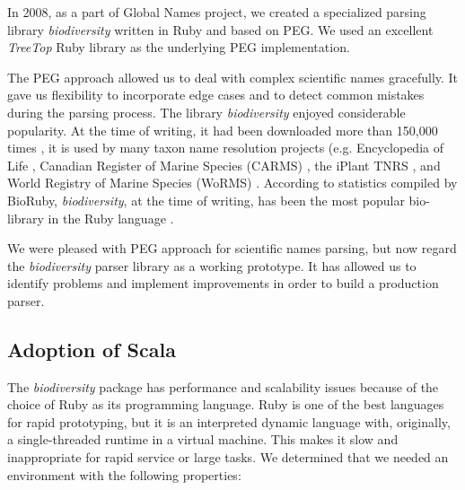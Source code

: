 \documentclass{bmcart}
\begin{document}
In 2008, as a part of Global Names project, we created a specialized parsing
library \textit{biodiversity} \cite{biodiversity} written in Ruby and based on
PEG\@. We used an excellent \textit{TreeTop} Ruby library \cite{treetop} as
the underlying PEG implementation.

The PEG approach allowed us to deal with complex scientific names gracefully.
It gave us flexibility to incorporate edge cases and to detect common mistakes
during the parsing process. The library \textit{biodiversity} enjoyed
considerable popularity. At the time of writing, it had been downloaded more
than 150,000 times \cite{bdiv-downloads}, it is used by many taxon name
resolution projects (e.g. Encyclopedia of Life \cite{eol}, Canadian Register of
Marine Species (CARMS) \cite{carms}, the iPlant TNRS \cite{iplant}, and World
Registry of Marine Species (WoRMS) \cite{worms}. According to statistics
compiled by BioRuby, \textit{biodiversity}, at the time of writing, has been
the most popular bio-library in the Ruby language \cite{biogems}.

We were pleased with PEG approach for scientific names parsing, but now regard
the \textit{biodiversity} parser library as a working prototype. It has allowed
us to identify problems and implement improvements in order to build a
production parser.

\subsection*{Adoption of Scala}

The \textit{biodiversity} package has performance and scalability issues
because of the choice of Ruby as its programming language. Ruby is one of the
best languages for rapid prototyping, but it is an interpreted dynamic language
with, originally, a single-threaded runtime in a virtual machine. This makes it
slow and inappropriate for rapid service or large tasks. We determined that we
needed an environment with the following properties:
\end{document}
